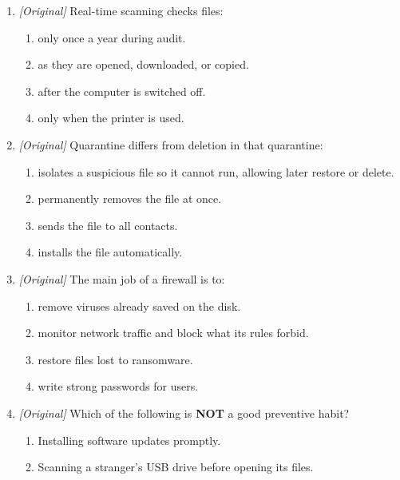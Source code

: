 \begin{enumerate}[label=\textbf{Q\arabic*.}, leftmargin=*]
\begin{enumerate}[label=\Alph*.]
    \item a stored pattern of a known virus used for recognition.
    \item a handwritten sign on a printed file.
    \item a password written on a USB drive.
    \item a firewall rule for blocking websites.
  \end{enumerate}
\item \textit{[Original]} Real-time scanning checks files:
  \begin{enumerate}[label=\Alph*.]
    \item only once a year during audit.
    \item as they are opened, downloaded, or copied.
    \item after the computer is switched off.
    \item only when the printer is used.
  \end{enumerate}
\item \textit{[Original]} Quarantine differs from deletion in that quarantine:
  \begin{enumerate}[label=\Alph*.]
    \item isolates a suspicious file so it cannot run, allowing later restore or delete.
    \item permanently removes the file at once.
    \item sends the file to all contacts.
    \item installs the file automatically.
  \end{enumerate}
\item \textit{[Original]} The main job of a firewall is to:
  \begin{enumerate}[label=\Alph*.]
    \item remove viruses already saved on the disk.
    \item monitor network traffic and block what its rules forbid.
    \item restore files lost to ransomware.
    \item write strong passwords for users.
  \end{enumerate}
\item \textit{[Original]} Which of the following is \textbf{NOT} a good
  preventive habit?
  \begin{enumerate}[label=\Alph*.]
    \item Installing software updates promptly.
    \item Scanning a stranger's USB drive before opening its files.

\end{enumerate}
\end{enumerate}
